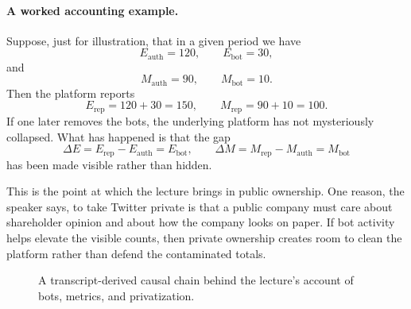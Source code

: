 \paragraph{A worked accounting example.}
Suppose, just for illustration, that in a given period we have
\[
E_{\mathrm{auth}} = 120,\qquad E_{\mathrm{bot}} = 30,
\]
and
\[
M_{\mathrm{auth}} = 90,\qquad M_{\mathrm{bot}} = 10.
\]
Then the platform reports
\begin{equation}
E_{\mathrm{rep}} = 120 + 30 = 150,
\qquad
M_{\mathrm{rep}} = 90 + 10 = 100.
\end{equation}
If one later removes the bots, the underlying platform has not mysteriously collapsed. What has happened is that the gap
\begin{equation}
\Delta E = E_{\mathrm{rep}} - E_{\mathrm{auth}} = E_{\mathrm{bot}},
\qquad
\Delta M = M_{\mathrm{rep}} - M_{\mathrm{auth}} = M_{\mathrm{bot}}
\end{equation}
has been made visible rather than hidden.

This is the point at which the lecture brings in public ownership. One reason, the speaker says, to take Twitter private is that a public company must care about shareholder opinion and about how the company looks on paper. If bot activity helps elevate the visible counts, then private ownership creates room to clean the platform rather than defend the contaminated totals.

\begin{figure}[h]
\centering
{}
\caption{A transcript-derived causal chain behind the lecture's account of bots, metrics, and privatization.}
\end{figure}

